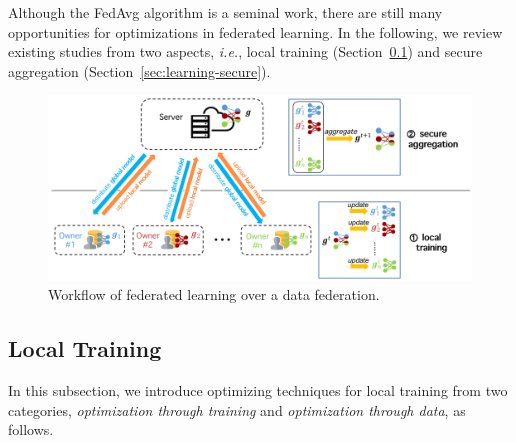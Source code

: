 \documentclass[11pt]{article}
\newcommand{\ie}{\textit{i.e.},\xspace}
\newcommand\secref[1]{Section~\ref{#1}}
\begin{document}
Although the \textsf{FedAvg} algorithm \cite{Yongxin-DBLP:conf/aistats/McMahanMRHA17} is a seminal work, there are still many opportunities for optimizations in federated learning.
In the following, we review existing studies from two aspects,
\ie local training (\secref{sec:learning-local}) and secure aggregation (\secref{sec:learning-secure}).

\begin{figure}[t]
\centering
    \includegraphics[width=0.85\linewidth]{submissions/YongxinTong/fig/fedavg.png}
	\caption{Workflow of federated learning over a data federation.}\label{fig:fedavg}
\end{figure}

\subsection{Local Training}\label{sec:learning-local}

In this subsection, we introduce optimizing techniques for local training from two categories, \textit{optimization through training} and \textit{optimization through data}, as follows.
\end{document}
